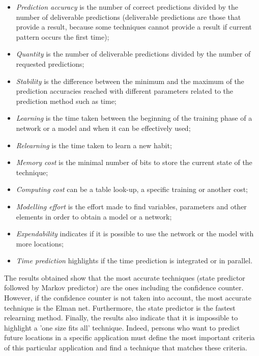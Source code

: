 \begin{itemize}

\item \emph{Prediction accuracy} is the number of correct predictions divided by the number of deliverable predictions (deliverable predictions are those that provide a result, because some techniques cannot provide a result if current pattern occurs the first time);

\item \emph{Quantity} is the number of deliverable predictions divided by the number of requested predictions;

\item \emph{Stability} is the difference between the minimum and the maximum of the prediction accuracies reached with different parameters related to the prediction method such as time;

\item \emph{Learning} is the time taken between the beginning of the training phase of a network or a model and when it can be effectively used;

\item \emph{Relearning} is the time taken to learn a new habit;

\item \emph{Memory cost} is the minimal number of bits to store the current state of the technique;

\item \emph{Computing cost} can be a table look-up, a specific training or another cost;

\item \emph{Modelling effort} is the effort made to find variables, parameters and other elements in order to obtain a model or a network;

\item \emph{Expendability} indicates if it is possible to use the network or the model with more locations;

\item \emph{Time prediction} highlights if the time prediction is integrated or in parallel.

\end{itemize}

The results obtained show that the most accurate techniques (state predictor followed by Markov predictor) are the ones including the confidence counter. However, if the confidence counter is not taken into account, the most accurate technique is the Elman net. Furthermore, the state predictor is the fastest relearning method. Finally, the results also indicate that it is impossible to highlight a 'one size fits all' technique. Indeed, persons who want to predict future locations in a specific application must define the most important criteria of this particular application and find a technique that matches these criteria.

